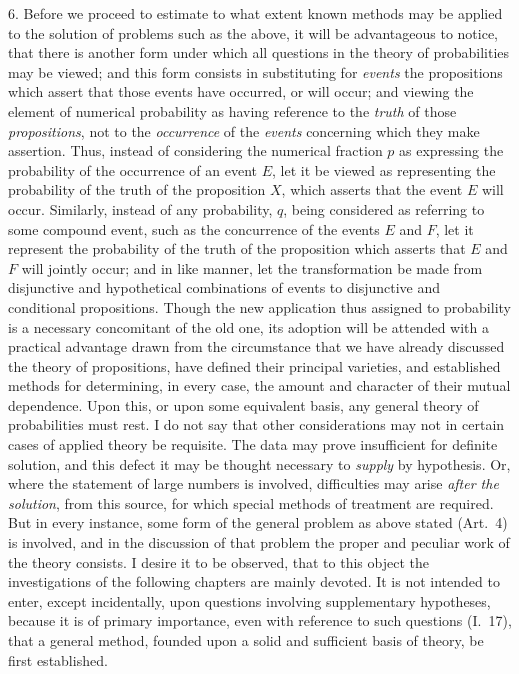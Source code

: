 \documentclass[oneside]{book}
\begin{document}
6. Before we proceed to estimate to what extent known methods
may be applied to the solution of problems such as the
above, it will be advantageous to notice, that there is another
form under which all questions in the theory of probabilities may
be viewed; and this form consists in substituting for \emph{events} the
propositions which assert that those events have occurred, or
will occur; and viewing the element of numerical probability as
having reference to the \emph{truth} of those \emph{propositions}, not to the
\emph{occurrence} of the \emph{events} concerning which they make assertion.
Thus, instead of considering the numerical fraction $p$ as expressing
the probability of the occurrence of an event $E$, let it
be viewed as representing the probability of the truth of the
proposition $X$, which asserts that the event $E$ will occur. Similarly,
instead of any probability, $q$, being considered as referring
to some compound event, such as the concurrence of the
events $E$ and $F$, let it represent the probability of the truth of
the proposition which asserts that $E$ and $F$ will jointly occur;
and in like manner, let the transformation be made from disjunctive and hypothetical combinations of events to disjunctive and
conditional propositions. Though the new application thus assigned to probability is a necessary concomitant of the old one,
its adoption will be attended with a practical advantage drawn
from the circumstance that we have already discussed the theory
of propositions, have defined their principal varieties, and established
methods for determining, in every case, the amount and
character of their mutual dependence. Upon this, or upon some
equivalent basis, any general theory of probabilities must rest.
I do not say that other considerations may not in certain cases of
applied theory be requisite. The data may prove insufficient for
definite solution, and this defect it may be thought necessary to
\emph{supply} by hypothesis. Or, where the statement of large numbers
is involved, difficulties may arise \emph{after the solution}, from this
source, for which special methods of treatment are required.
But in every instance, some form of the general problem as above
stated (Art.~4) is involved, and in the discussion of that problem
the proper and peculiar work of the theory consists. I desire it
to be observed, that to this object the investigations of the following
chapters are mainly devoted. It is not intended to enter,
except incidentally, upon questions involving supplementary hypotheses,
because it is of primary importance, even with reference
to such questions (I.~17), that a general method, founded upon
a solid and sufficient basis of theory, be first established.
\end{document}
